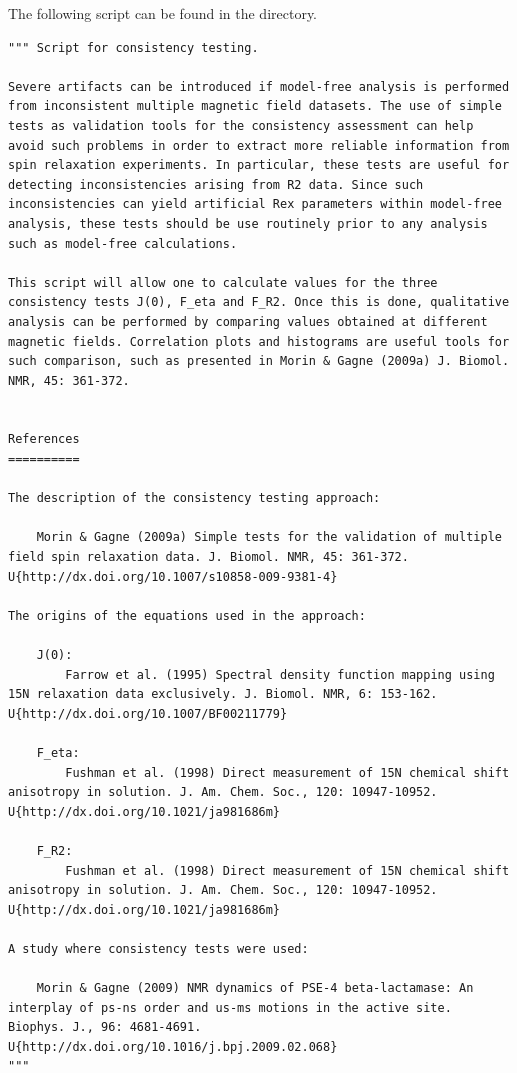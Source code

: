 The following script can be found in the  directory.

\begin{lstlisting}
""" Script for consistency testing.

Severe artifacts can be introduced if model-free analysis is performed from inconsistent multiple magnetic field datasets. The use of simple tests as validation tools for the consistency assessment can help avoid such problems in order to extract more reliable information from spin relaxation experiments. In particular, these tests are useful for detecting inconsistencies arising from R2 data. Since such inconsistencies can yield artificial Rex parameters within model-free analysis, these tests should be use routinely prior to any analysis such as model-free calculations.

This script will allow one to calculate values for the three consistency tests J(0), F_eta and F_R2. Once this is done, qualitative analysis can be performed by comparing values obtained at different magnetic fields. Correlation plots and histograms are useful tools for such comparison, such as presented in Morin & Gagne (2009a) J. Biomol. NMR, 45: 361-372.


References
==========

The description of the consistency testing approach:

    Morin & Gagne (2009a) Simple tests for the validation of multiple field spin relaxation data. J. Biomol. NMR, 45: 361-372. U{http://dx.doi.org/10.1007/s10858-009-9381-4}

The origins of the equations used in the approach:

    J(0):
        Farrow et al. (1995) Spectral density function mapping using 15N relaxation data exclusively. J. Biomol. NMR, 6: 153-162. U{http://dx.doi.org/10.1007/BF00211779}

    F_eta:
        Fushman et al. (1998) Direct measurement of 15N chemical shift anisotropy in solution. J. Am. Chem. Soc., 120: 10947-10952. U{http://dx.doi.org/10.1021/ja981686m}

    F_R2:
        Fushman et al. (1998) Direct measurement of 15N chemical shift anisotropy in solution. J. Am. Chem. Soc., 120: 10947-10952. U{http://dx.doi.org/10.1021/ja981686m}

A study where consistency tests were used:

    Morin & Gagne (2009) NMR dynamics of PSE-4 beta-lactamase: An interplay of ps-ns order and us-ms motions in the active site. Biophys. J., 96: 4681-4691. U{http://dx.doi.org/10.1016/j.bpj.2009.02.068}
"""


\end{lstlisting}
